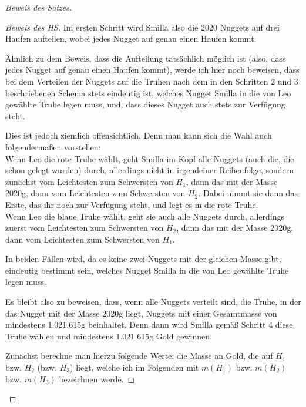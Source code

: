 \begin{proof}[Beweis des Satzes]
\begin{proof}[Beweis des HS]
        Im ersten Schritt wird Smilla also die 2020 Nuggets auf drei Haufen aufteilen, wobei jedes Nugget auf genau 
        einen Haufen kommt.
        
        Ähnlich zu dem Beweis, dass die Aufteilung tatsächlich möglich ist (also, dass jedes Nugget auf genau 
        einen Haufen kommt), werde ich hier noch beweisen, dass bei dem Verteilen der Nuggets auf die 
        Truhen nach dem in den Schritten 2 und 3 beschriebenen Schema stets eindeutig ist, welches Nugget Smilla in 
        die von Leo gewählte Truhe legen muss, und, dass dieses Nugget auch stets zur Verfügung steht.

        Dies ist jedoch ziemlich offensichtlich. Denn man kann sich die Wahl auch folgendermaßen vorstellen:\\
        Wenn Leo die rote Truhe wählt, geht Smilla im Kopf alle Nuggets (auch die, die schon gelegt wurden) durch, 
        allerdings nicht in irgendeiner Reihenfolge, sondern zunächst vom Leichtesten zum Schwersten von $H_1$, 
        dann das mit der Masse 2020g, dann vom Leichtesten zum Schwersten von $H_2$. Dabei nimmt sie dann das Erste, 
        das ihr noch zur Verfügung steht, und legt es in die rote Truhe. \\
        Wenn Leo die blaue Truhe wählt, geht sie auch alle Nuggets durch, allerdings zuerst vom Leichtesten zum 
        Schwersten von $H_2$, dann das mit der Masse 2020g, dann vom Leichtesten zum Schwersten von $H_1$.

        In beiden Fällen wird, da es keine zwei Nuggets mit der gleichen Masse gibt, eindeutig bestimmt sein, welches 
        Nugget Smilla in die von Leo gewählte Truhe legen muss.

        Es bleibt also zu beweisen, dass, wenn alle Nuggets verteilt sind, die Truhe, in der das Nugget mit der Masse 
        2020g liegt, Nuggets mit einer Gesamtmasse von mindestens 1.021.615g beinhaltet. Denn dann wird Smilla gemäß 
        Schritt 4 diese Truhe wählen und mindestens 1.021.615g Gold gewinnen.

        Zunächst berechne man hierzu folgende Werte: die Masse an Gold, die auf $H_1$ bzw. $H_2$ (bzw. $H_3$) liegt, 
        welche ich im Folgenden mit $m(H_1)$ bzw. $m(H_2)$ bzw. $m(H_3)$ bezeichnen werde.


\end{proof}
\end{proof}
